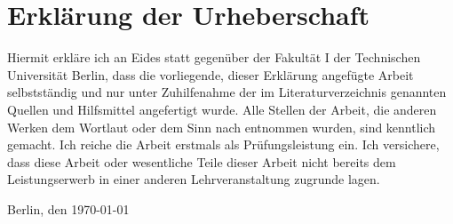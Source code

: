 \chapter*{Erklärung der Urheberschaft}
Hiermit erkläre ich an Eides statt gegenüber der Fakultät I der Technischen Universität Berlin, dass die 
vorliegende, dieser Erklärung angefügte Arbeit  selbstständig und nur unter Zuhilfenahme der im 
Literaturverzeichnis genannten Quellen und Hilfsmittel angefertigt wurde. Alle Stellen der Arbeit, die anderen 
Werken dem Wortlaut oder dem Sinn nach entnommen wurden, sind kenntlich gemacht. Ich reiche die Arbeit 
erstmals als Prüfungsleistung ein. Ich versichere, dass diese Arbeit oder wesentliche Teile dieser Arbeit 
nicht bereits dem Leistungserwerb in einer anderen Lehrveranstaltung zugrunde lagen.

\vspace{4cm}



\noindent
Berlin, den \today %
{} %
